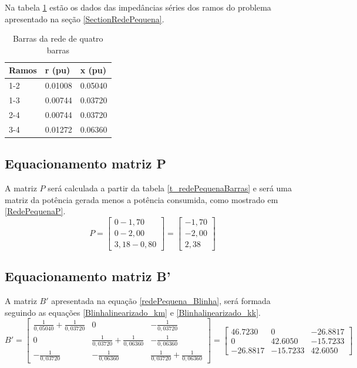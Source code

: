 Na tabela \ref{t_redePequenaRamos} estão os dados das impedâncias séries dos ramos do problema apresentado na seção \ref{SectionRedePequena}.
\begin{table}[!htb]
\centering
\caption{Barras da rede de quatro barras}
\begin{tabular}{lll}
\hline
Ramos & r (pu) & x (pu) \\ \hline
1-2 & 0.01008 & 0.05040 \\
1-3 & 0.00744 & 0.03720 \\
2-4 & 0.00744 & 0.03720 \\
3-4 & 0.01272 & 0.06360 \\ \hline
\end{tabular}
\label{t_redePequenaRamos}
\end{table}
\subsection{Equacionamento matriz P}
A matriz $P$ será calculada a partir da tabela \ref{t_redePequenaBarras} e será uma matriz da potência gerada menos a potência consumida, como mostrado em \ref{RedePequenaP}. 
\begin{equation}
    P = \left[ 
    \begin{matrix} 
        0 - 1,70 \\
        0 - 2,00 \\
        3,18 - 0,80
    \end{matrix} \right]=\left[ 
    \begin{matrix} 
        -1,70 \\
        - 2,00 \\
        2,38
    \end{matrix} \right]   
    \label{RedePequenaP}
\end{equation}

\subsection{Equacionamento matriz B'}
A matriz $B'$ apresentada na equação \ref{redePequena_Blinha}, será formada seguindo as equações \ref{Blinhalinearizado_km} e \ref{Blinhalinearizado_kk}.
\begin{equation}
  B' = \left[ 
    \begin{matrix} 
        \frac{1}{0,05040}+\frac{1}{0,03720} &     0       & -\frac{1}{0,03720}\\
        0       &    \frac{1}{0,03720}+\frac{1}{0,06360}  & -\frac{1}{0,06360}\\
        -\frac{1}{0,03720}&    -\frac{1}{0,06360} &  \frac{1}{0,03720}+\frac{1}{0,06360}
    \end{matrix} \right] = \left[ 
    \begin{matrix} 
        46.7230 &     0       & -26.8817\\
        0       &    42.6050  & -15.7233\\
        -26.8817&    -15.7233 &  42.6050
    \end{matrix} \right] 
    \label{redePequena_Blinha}
\end{equation}

